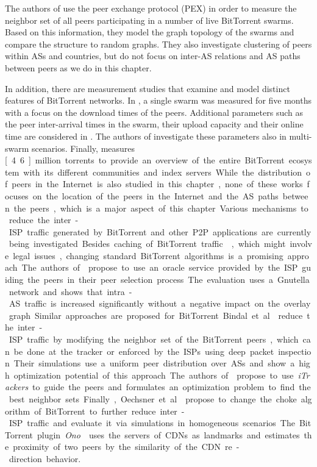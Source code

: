 The authors of \cite{Kryczka2011} use the peer exchange protocol (PEX) in order to measure the neighbor set of all peers participating in a number of live BitTorrent swarms. Based on this information, they model the graph topology of the swarms and compare the structure to random graphs. They also investigate clustering of peers within ASs and countries, but do not focus on inter-AS relations and AS paths between peers as we do in this chapter.

In addition, there are measurement studies that examine and model distinct features of BitTorrent networks. In \cite{Izal2004}, a single swarm was measured for five months with a focus on the download times of the peers. Additional parameters such as the peer inter-arrival times in the swarm, their upload capacity and their online time are considered in \cite{Pouwelse2005}. The authors of \cite{Guo2005} investigate these parameters also in multi-swarm scenarios. Finally, \cite{Zhang2010} measures \unit[4.6]{million} torrents to provide an overview of the entire BitTorrent ecosystem with its different communities and index servers.
While the distribution of peers in the Internet is also studied in this chapter, none of these works focuses on the location of the peers in the Internet and the AS paths between the peers, which is a major aspect of this chapter.

%
Various mechanisms to reduce the inter-ISP traffic generated by BitTorrent and other P2P applications are currently being investigated. Besides caching of BitTorrent traffic \cite{Lehrieder2010a,Lehrieder2012,Pacifici2012}, which might involve legal issues, changing standard BitTorrent algorithms is a promising approach. The authors of \cite{Aggarwal2007} propose to use an oracle service provided by the ISP guiding the peers in their peer selection process. The evaluation uses a Gnutella network and shows that intra-AS traffic is increased significantly without a negative impact on the overlay graph. Similar approaches are proposed for BitTorrent. Bindal et al. \cite{Bindal2006} reduce the inter-ISP traffic by modifying the neighbor set of the BitTorrent peers, which can be done at the tracker or enforced by the ISPs using deep packet inspection. Their simulations use a uniform peer distribution over ASs and show a high optimization potential of this approach. The authors of \cite{Xie2008} propose to use \emph{iTrackers} to guide the peers and formulates an optimization problem to find the best neighbor sets. Finally, Oechsner et al. \cite{Oechsner2009} propose to change the choke algorithm of BitTorrent to further reduce inter-ISP traffic and evaluate it via simulations in homogeneous scenarios. The BitTorrent plugin \emph{Ono} \cite{Choffnes2008} uses the servers of CDNs as landmarks and estimates the proximity of two peers by the similarity of the CDN re-direction behavior.
%

